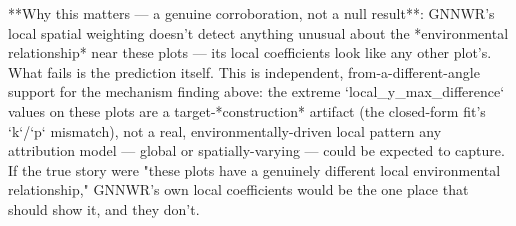 **Why this matters — a genuine corroboration, not a null result**: GNNWR's local spatial weighting
doesn't detect anything unusual about the *environmental relationship* near these plots — its local
coefficients look like any other plot's. What fails is the prediction itself. This is independent,
from-a-different-angle support for the mechanism finding above: the extreme `local_y_max_difference`
values on these plots are a target-*construction* artifact (the closed-form fit's `k`/`p` mismatch),
not a real, environmentally-driven local pattern any attribution model — global or spatially-varying
— could be expected to capture. If the true story were "these plots have a genuinely different local
environmental relationship," GNNWR's own local coefficients would be the one place that should show
it, and they don't.
